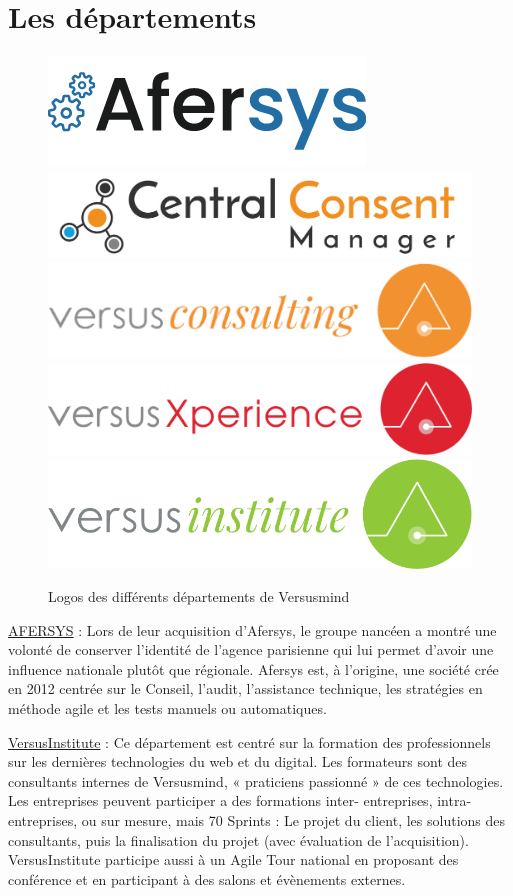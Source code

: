 \documentclass[12pt, a4paper]{report}
\begin{document}
\section{Les départements}
\begin{figure}[H]
    \centering
    \includegraphics[width=.35\textwidth]{afersys.png}
    \includegraphics[width=.5\textwidth]{ccm_.png}
    \includegraphics[width=.45\textwidth]{versusconsulting.png}
    \includegraphics[width=.5\textwidth]{versusxperience.png}
    \includegraphics[width=.45\textwidth]{versusinstitute.png}
    \caption{Logos des différents départements de Versusmind}
\end{figure}
\underline{AFERSYS} : Lors de leur acquisition d’Afersys, le groupe nancéen a montré une volonté de conserver
l’identité de l’agence parisienne qui lui permet d’avoir une influence nationale plutôt que régionale.
Afersys est, à l’origine, une société crée en 2012 centrée sur le Conseil, l’audit, l’assistance technique,
les stratégies en méthode agile et les tests manuels ou automatiques.\newline

\underline{VersusInstitute} : Ce département est centré sur la formation des professionnels sur les dernières
technologies du web et du digital. Les formateurs sont des consultants internes de Versusmind,
« praticiens passionné » de ces technologies. Les entreprises peuvent participer a des formations inter-
entreprises, intra-entreprises, ou sur mesure, mais 70%
Sprints : Le projet du client, les solutions des consultants, puis la finalisation du projet (avec évaluation
de l’acquisition). VersusInstitute participe aussi à un Agile Tour national en proposant des conférence
et en participant à des salons et évènements externes.\newline
\end{document}
